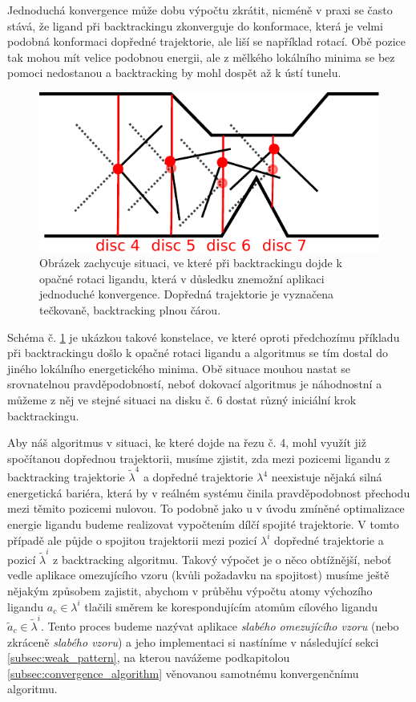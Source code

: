 Jednoduchá konvergence může dobu výpočtu zkrátit, nicméně v praxi se často stává,
že ligand při backtrackingu zkonverguje do konformace, která je velmi podobná
konformaci dopředné trajektorie, ale liší se například rotací. Obě pozice tak
mohou mít velice podobnou energii, ale z mělkého lokálního minima se bez pomoci
nedostanou a backtracking by mohl dospět až k ústí tunelu.

\begin{figure}[ht]
\centering
\includegraphics[width=.5\hsize]{img/backtracking_bad_rotation.pdf}
\caption{Obrázek zachycuje situaci, ve které při backtrackingu dojde k opačné
rotaci ligandu, která v důsledku znemožní aplikaci jednoduché konvergence.
Dopředná trajektorie je vyznačena tečkovaně, backtracking plnou čárou.
}
\label{fig:backtracking_bad}
\end{figure}

Schéma č. \ref{fig:backtracking_bad} je ukázkou takové konstelace, ve které
oproti předchozímu příkladu při backtrackingu došlo k opačné rotaci ligandu
a algoritmus se tím dostal do jiného lokálního energetického minima. Obě situace
mouhou nastat se srovnatelnou pravděpodobností, neboť dokovací algoritmus je
náhodnostní a můžeme z něj ve stejné situaci na disku č. 6 dostat různý iniciální
krok backtrackingu.

Aby náš algoritmus v situaci, ke které dojde na řezu č. 4, mohl využít již spočítanou
dopřednou trajektorii, musíme zjistit, zda mezi pozicemi ligandu z backtracking trajektorie
$ \tilde{\lambda}^4 $ a dopředné trajektorie $ \lambda^4 $ neexistuje nějaká silná
energetická bariéra, která by v reálném systému činila pravděpodobnost přechodu
mezi těmito pozicemi nulovou. To podobně jako u v úvodu zmíněné optimalizace
energie ligandu budeme realizovat vypočtením dílčí spojité trajektorie.
V tomto případě ale půjde o spojitou trajektorii mezi pozicí $ \lambda^i $ dopředné
trajektorie a pozicí $ \tilde{\lambda}^i $ z backtracking algoritmu. Takový
výpočet je o něco obtížnější, neboť vedle aplikace omezujícího vzoru (kvůli
požadavku na spojitost) musíme ještě nějakým způsobem zajistit, abychom v průběhu
výpočtu atomy výchozího ligandu $ a_c \in \lambda^i $ tlačili
směrem ke korespondujícím atomům cílového ligandu $ \tilde{a}_c \in \tilde{\lambda}^i $.
Tento proces budeme nazývat aplikace \textit{slabého omezujícího vzoru} (nebo
zkráceně \textit{slabého vzoru}) a jeho implementaci si nastíníme v následující
sekci \ref{subsec:weak_pattern}, na kterou navážeme podkapitolou
\ref{subsec:convergence_algorithm} věnovanou samotnému konvergenčnímu algoritmu.




